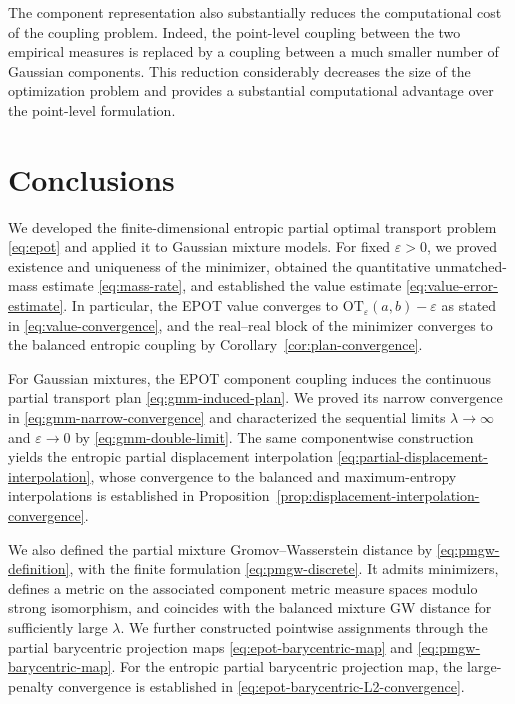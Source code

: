 \documentclass[a4paper,11pt]{article}
\numberwithin{equation}{section}
\newcommand{\eps}{\varepsilon}
\newcommand{\OT}{\mathrm{OT}}
\begin{document}
The component representation also substantially reduces the computational cost of the coupling problem. Indeed, the point-level coupling between the two empirical measures is replaced by a coupling between a much smaller number of Gaussian components. This reduction considerably decreases the size of the optimization problem and provides a substantial computational advantage over the point-level formulation.


\section{Conclusions}\label{sec:conclusions}
We developed the finite-dimensional entropic partial optimal transport problem \eqref{eq:epot} and applied it to Gaussian mixture models. For fixed $\eps > 0$, we proved existence and uniqueness of the minimizer, obtained the quantitative unmatched-mass estimate \eqref{eq:mass-rate}, and established the value estimate \eqref{eq:value-error-estimate}. In particular, the EPOT value converges to $\OT_{\eps}(a,b)-\eps$ as stated in \eqref{eq:value-convergence}, and the real--real block of the minimizer converges to the balanced entropic coupling by Corollary~\ref{cor:plan-convergence}.

For Gaussian mixtures, the EPOT component coupling induces the continuous partial transport plan \eqref{eq:gmm-induced-plan}. We proved its narrow convergence in \eqref{eq:gmm-narrow-convergence} and characterized the sequential limits $\lambda \to \infty$ and $\eps \to 0$ by \eqref{eq:gmm-double-limit}. The same componentwise construction yields the entropic partial displacement interpolation \eqref{eq:partial-displacement-interpolation}, whose convergence to the balanced and maximum-entropy interpolations is established in Proposition~\ref{prop:displacement-interpolation-convergence}.

We also defined the partial mixture Gromov--Wasserstein distance by \eqref{eq:pmgw-definition}, with the finite formulation \eqref{eq:pmgw-discrete}. It admits minimizers, defines a metric on the associated component metric measure spaces modulo strong isomorphism, and coincides with the balanced mixture GW distance for sufficiently large $\lambda$. We further constructed pointwise assignments through the partial barycentric projection maps \eqref{eq:epot-barycentric-map} and \eqref{eq:pmgw-barycentric-map}. For the entropic partial barycentric projection map, the large-penalty convergence is established in \eqref{eq:epot-barycentric-L2-convergence}.
\end{document}
